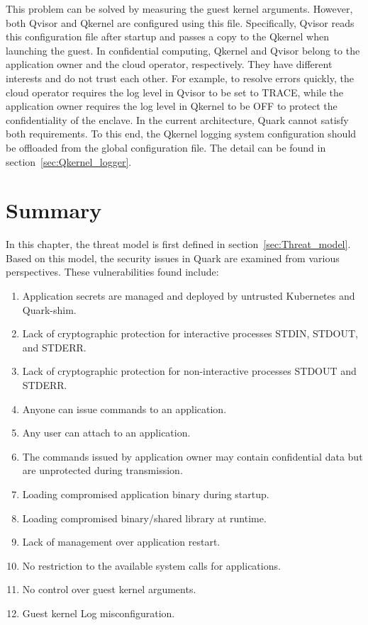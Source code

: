 This problem can be solved by measuring the guest kernel arguments. However, both Qvisor and Qkernel are configured using this file. Specifically, Qvisor reads this configuration file after startup and passes a copy to the Qkernel when launching the guest. In confidential 
computing, Qkernel and Qvisor belong to the application owner and the cloud operator, respectively. They have different interests and do not trust each other. For example, to resolve errors quickly, the cloud operator requires the log level in Qvisor to be set to TRACE, while the application owner 
requires the log level in Qkernel to be OFF to protect the confidentiality of the enclave. In the current architecture, Quark cannot satisfy both requirements. To this end, the Qkernel logging system configuration should be offloaded from the global configuration 
file. The detail can be found in section~\ref{sec:Qkernel_logger}.




\section{Summary}
In this chapter, the threat model is first defined in section~\ref{sec:Threat_model}. Based on this model, the security issues in Quark are examined from various perspectives. These vulnerabilities found include:
\begin{enumerate}
  \item \label{vulnerabilities:1} Application secrets are managed and deployed by untrusted Kubernetes and Quark-shim.
  \item \label{vulnerabilities:2} Lack of cryptographic protection for interactive processes STDIN, STDOUT, and STDERR.
  \item \label{vulnerabilities:3} Lack of cryptographic protection for non-interactive processes STDOUT and STDERR.
  \item \label{vulnerabilities:4} Anyone can issue commands to an application.
  \item \label{vulnerabilities:5} Any user can attach to an application.
  \item \label{vulnerabilities:6} The commands issued by application owner may contain confidential data but are unprotected during transmission.
  \item \label{vulnerabilities:7} Loading compromised application binary during startup.
  \item \label{vulnerabilities:8} Loading compromised binary/shared library at runtime.
  \item \label{vulnerabilities:9}  Lack of management over application restart.
  \item \label{vulnerabilities:10} No restriction to the available system calls for applications.
  \item \label{vulnerabilities:11} No control over guest kernel arguments.
  \item \label{vulnerabilities:12} Guest kernel Log misconfiguration.

\end{enumerate}

